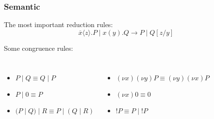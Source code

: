 \documentclass{beamer}
\begin{document}
\begin{frame}
\frametitle{Semantic}

The most important reduction rules:
\begin{equation*}
\overline{x}\langle z \rangle.P \;|\; x(y).Q \rightarrow P \;|\; Q[z/y]
\end{equation*}

\vspace{10pt}

Some congruence rules:
\begin{columns}

\column{5cm}
\begin{itemize}
\item $P\;|\;Q \equiv Q\;|\;P$
\item $P\;|\;0 \equiv P$
\item $(P\;|\;Q)\;|\;R \equiv P\;|\;(Q\;|\;R)$
\end{itemize}

\column{5cm}
\begin{itemize}
\item $(\nu x)(\nu y)P \equiv (\nu y)(\nu x)P$
\item $(\nu x)0 \equiv 0$
\item $!P \equiv P\;|\;!P$
\end{itemize}

\end{columns}
\end{frame}
\end{document}
